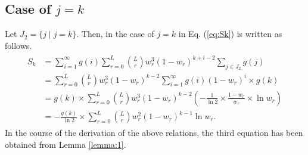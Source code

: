 \subsection{Case of $j=k$}
Let $J_2=\{j\mid j=k\}$. Then, in the case of $j=k$ in Eq. (\ref{eq:Sk}) is written as follows.
\begin{align}\begin{split}
  S_{k} 
  &= \sum_{i=1}^{\infty} g(i) \sum_{r=0}^{L} \binom{L}{r} w_r^3 (1-w_r)^{k+i-2} \sum_{j \in J_2} g(j)\\
  &= \sum_{r=0}^{L} \binom{L}{r} w_r^3 (1-w_r)^{k-2} \sum_{i=1}^{\infty} g(i) (1-w_r)^{i} \times g(k) \\
  &= g(k) \times \sum_{r=0}^{L} \binom{L}{r} w_r^3 (1-w_r)^{k-2} \left( -\frac{1}{\ln 2} \times \frac{1-w_{r}}{w_{r}} \times \ln w_{r} \right) \\
  &= -\frac{g(k)}{\ln 2} \times \sum_{r=0}^{L} \binom{L}{r} w_r^2 (1-w_r)^{k-1} \ln w_{r}.
\end{split}\end{align}
In the course of the derivation of the above relations, the third equation has been obtained from Lemma \ref{lemma:1}.
